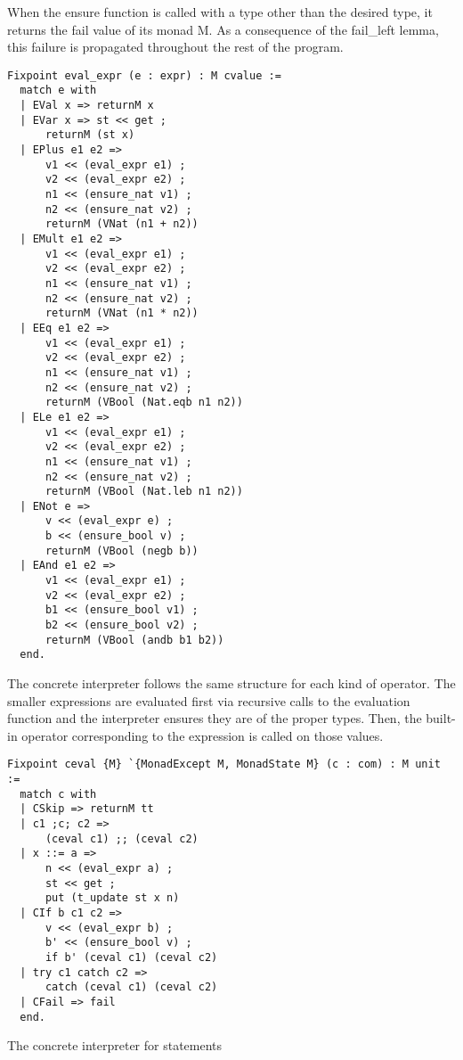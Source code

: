 When the ensure function is called with a type other than the desired type, it
returns the fail value of its monad M. As a consequence of the
fail\_left lemma, this failure is propagated throughout the rest of the
program.

\begin{listing}[H]
\begin{verbatim}
Fixpoint eval_expr (e : expr) : M cvalue :=
  match e with
  | EVal x => returnM x
  | EVar x => st << get ;
      returnM (st x)
  | EPlus e1 e2 => 
      v1 << (eval_expr e1) ;
      v2 << (eval_expr e2) ;
      n1 << (ensure_nat v1) ;
      n2 << (ensure_nat v2) ;
      returnM (VNat (n1 + n2))
  | EMult e1 e2 =>
      v1 << (eval_expr e1) ;
      v2 << (eval_expr e2) ;
      n1 << (ensure_nat v1) ;
      n2 << (ensure_nat v2) ;
      returnM (VNat (n1 * n2))
  | EEq e1 e2 =>
      v1 << (eval_expr e1) ;
      v2 << (eval_expr e2) ;
      n1 << (ensure_nat v1) ;
      n2 << (ensure_nat v2) ;
      returnM (VBool (Nat.eqb n1 n2))
  | ELe e1 e2 =>
      v1 << (eval_expr e1) ;
      v2 << (eval_expr e2) ;
      n1 << (ensure_nat v1) ;
      n2 << (ensure_nat v2) ;
      returnM (VBool (Nat.leb n1 n2))
  | ENot e =>
      v << (eval_expr e) ;
      b << (ensure_bool v) ;
      returnM (VBool (negb b))
  | EAnd e1 e2 =>
      v1 << (eval_expr e1) ;
      v2 << (eval_expr e2) ;
      b1 << (ensure_bool v1) ;
      b2 << (ensure_bool v2) ;
      returnM (VBool (andb b1 b2))
  end.
\end{verbatim}
\end{listing}

The concrete interpreter follows the same structure for each kind of operator.
The smaller expressions are evaluated first via recursive calls to the
evaluation function and the interpreter
ensures they are of the proper types. Then, the built-in operator corresponding
to the expression is called on those values.

\begin{listing}[H]
\begin{verbatim}
Fixpoint ceval {M} `{MonadExcept M, MonadState M} (c : com) : M unit :=
  match c with
  | CSkip => returnM tt
  | c1 ;c; c2 => 
      (ceval c1) ;; (ceval c2)
  | x ::= a => 
      n << (eval_expr a) ;
      st << get ;
      put (t_update st x n)
  | CIf b c1 c2 => 
      v << (eval_expr b) ;
      b' << (ensure_bool v) ;
      if b' (ceval c1) (ceval c2)
  | try c1 catch c2 =>
   	  catch (ceval c1) (ceval c2)
  | CFail => fail
  end.
\end{verbatim}
\caption{The concrete interpreter for statements}
\label{lst:concrete_statements}
\end{listing}

